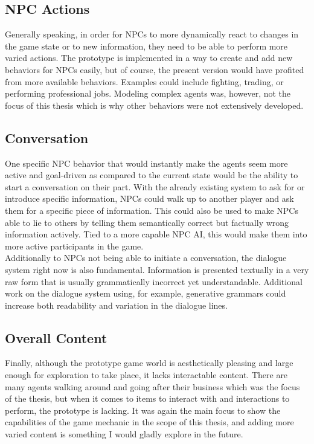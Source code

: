 \subsection{NPC Actions}
Generally speaking, in order for NPCs to more dynamically react to changes in the game state or to new information, they need to be able to perform more varied actions. The prototype is implemented in a way to create and add new behaviors for NPCs easily, but of course, the present version would have profited from more available behaviors. Examples could include fighting, trading, or performing professional jobs. Modeling complex agents was, however, not the focus of this thesis which is why other behaviors were not extensively developed.
\subsection{Conversation}
One specific NPC behavior that would instantly make the agents seem more active and goal-driven as compared to the current state would be the ability to start a conversation on their part. With the already existing system to ask for or introduce specific information, NPCs could walk up to another player and ask them for a specific piece of information. This could also be used to make NPCs able to lie to others by telling them semantically correct but factually wrong information actively. Tied to a more capable NPC AI, this would make them into more active participants in the game.\\
Additionally to NPCs not being able to initiate a conversation, the dialogue system right now is also fundamental. Information is presented textually in a very raw form that is usually grammatically incorrect yet understandable. Additional work on the dialogue system using, for example, generative grammars could increase both readability and variation in the dialogue lines.
\subsection{Overall Content}
Finally, although the prototype game world is aesthetically pleasing and large enough for exploration to take place, it lacks interactable content. There are many agents walking around and going after their business which was the focus of the thesis, but when it comes to items to interact with and interactions to perform, the prototype is lacking. It was again the main focus to show the capabilities of the game mechanic in the scope of this thesis, and adding more varied content is something I would gladly explore in the future.

